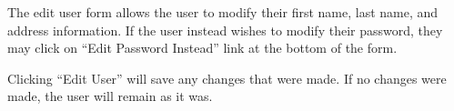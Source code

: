 The edit user form allows the user to modify their first name, last name, and address information. If the user instead wishes to modify their password, they may click on ``Edit Password Instead'' link at the bottom of the form.

Clicking ``Edit User'' will save any changes that were made. If no changes were made, the user will remain as it was.
